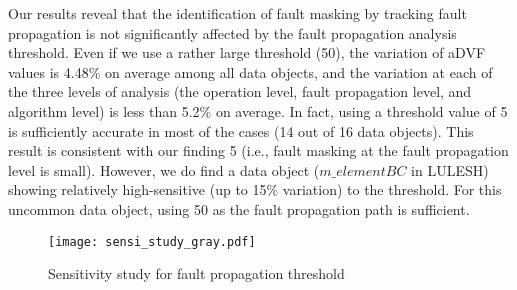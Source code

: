 Our results reveal that the identification of fault masking by tracking fault propagation is not significantly 
affected by the fault propagation analysis threshold. Even if we use a rather large threshold (50), 
the variation of aDVF values is 4.48\% on average among all data objects,
and the variation at each of the three levels of analysis (the operation level, fault propagation level,  and algorithm level) is less than 5.2\% on average. 
In fact, using a threshold value of 5 is sufficiently accurate in most of the cases (14 out of 16 data objects).
This result is consistent with our finding 5 (i.e., fault masking at the fault propagation level is small). %
However, we do find a data object ($m\_elementBC$ in LULESH) %
showing relatively high-sensitive (up to 15\% variation) to the threshold. For this uncommon data object, using 50 as the fault propagation path is sufficient. 


\begin{figure}
		\begin{center}
		\texttt{[image: sensi\_study\_gray.pdf]}
		\vspace{-15pt}
		\caption{Sensitivity study for fault propagation threshold}
		\label{fig:sensitivity_error_propagation}
		\end{center}
\vspace{-15pt}
\end{figure}



